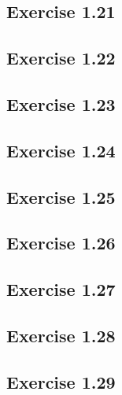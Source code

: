 \documentclass[letterpaper, leqno]{article}
\begin{document}
%

\subsection*{Exercise 1.21}
%

\subsection*{Exercise 1.22}
%

\subsection*{Exercise 1.23}
%

\subsection*{Exercise 1.24}
%

\subsection*{Exercise 1.25}
%

\subsection*{Exercise 1.26}
%

\subsection*{Exercise 1.27}
%

\subsection*{Exercise 1.28}
%

\subsection*{Exercise 1.29}
%
\end{document}
